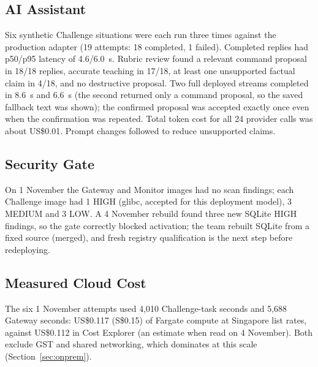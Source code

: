 \documentclass[11pt,a4paper]{article}
\begin{document}
\subsection{AI Assistant}
Six synthetic Challenge situations were each run three times against the
production adapter (19 attempts: 18 completed, 1 failed). Completed replies had
p50/p95 latency of 4.6/6.0~s. Rubric review found a relevant command proposal
in 18/18 replies, accurate teaching in 17/18, at least one unsupported factual
claim in 4/18, and no destructive proposal. Two full deployed streams completed in
8.6~s and 6.6~s (the second returned only a command proposal, so the saved
fallback text was shown); the confirmed proposal was accepted exactly once even
when the confirmation was repeated. Total token cost for all 24 provider calls was about
US\$0.01. Prompt changes followed to reduce unsupported claims.

\subsection{Security Gate}
On 1 November the Gateway and Monitor images had no scan findings; each
Challenge image had 1 HIGH (glibc, accepted for this deployment model), 3 MEDIUM
and 3 LOW. A 4 November rebuild found three new SQLite HIGH findings, so the
gate correctly blocked activation; the team rebuilt SQLite from a fixed source
(merged), and fresh registry qualification is the next step before redeploying.

\subsection{Measured Cloud Cost}
The six 1 November attempts used 4,010 Challenge-task seconds and 5,688 Gateway
seconds: US\$0.117 (S\$0.15) of Fargate compute at Singapore list rates, against
US\$0.112 in Cost Explorer (an estimate when read on 4 November). Both exclude
GST and shared networking, which dominates at this scale (Section~\ref{sec:onprem}).
\end{document}
